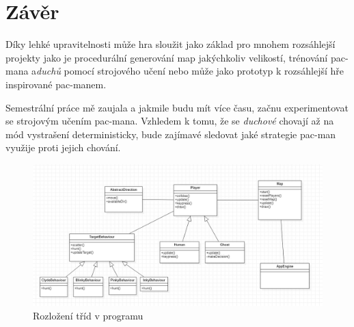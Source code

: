 \documentclass[czech]{pyt-report}
\begin{document}
\section{Závěr}
Díky lehké upravitelnosti může hra sloužit jako základ pro mnohem rozsáhlejší projekty jako je procedurální generování map jakýchkoliv velikostí, trénování pac-mana a\textit{duchů} pomocí strojového učení nebo může jako prototyp k rozsáhlejší hře inspirované pac-manem.\par
Semestrální práce mě zaujala a jakmile budu mít více času, začnu experimentovat se strojovým učením pac-mana. Vzhledem k tomu, že se \textit{duchové} chovají až na mód vystrašení deterministicky, bude zajímavé sledovat jaké strategie pac-man využije proti jejich chování.

\begin{figure}[h]
  \centering\leavevmode
  \includegraphics[width=1\linewidth]{img/class_diagram.jpg}
  \caption{Rozložení tříd v programu}
  \label{fig:par-y}
\end{figure}


\nocite{Pittman}
\nocite{ghosts}
%

\end{document}
